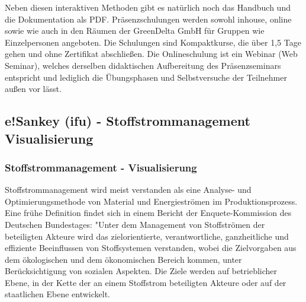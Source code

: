 \documentclass[a4paper, 12pt, twoside, BCOR=20mm, DIV=calc, abstracton, parskip=half*, toc=bibliography, toc=listof, headsepline, footsepline, headings=small, numbers=enddot]{scrreprt}
\begin{document}
Neben diesen interaktiven Methoden gibt es natürlich noch das Handbuch und die Dokumentation als PDF. 
Präsenzschulungen werden sowohl inhouse, online sowie wie auch in den Räumen der GreenDelta GmbH für Gruppen wie Einzelpersonen angeboten. Die Schulungen sind Kompaktkurse, die über 1,5 Tage gehen und ohne Zertifikat abschließen. Die Onlineschulung ist ein Webinar (Web Seminar), welches derselben didaktischen Aufbereitung des Präsenzseminars entspricht und lediglich die Übungsphasen und Selbstversuche der Teilnehmer außen vor lässt.  

\subsection{e!Sankey (ifu) - Stoffstrommanagement Visualisierung}
	\subsubsection{Stoffstrommanagement - Visualisierung}
Stoffstrommanagement wird meist verstanden als eine Analyse- und Optimierungsmethode von Material und Energieströmen im Produktionsprozess\cite[S. 167]{wohlgemuth2005komponentenbasierte}. Eine frühe Definition findet sich in einem Bericht der Enquete-Kommission des Deutschen Bundestages:
"Unter dem Management von Stoffströmen der beteiligten Akteure wird das zielorientierte, verantwortliche, ganzheitliche und effiziente Beeinflussen
von Stoffsystemen verstanden, wobei die Zielvorgaben aus dem ökologischen und dem ökonomischen Bereich kommen, unter Berücksichtigung von sozialen Aspekten. Die Ziele werden auf betrieblicher Ebene, in der Kette der an einem Stoffstrom beteiligten Akteure oder auf der staatlichen Ebene entwickelt.\cite[S. 259]{raey}
\end{document}
